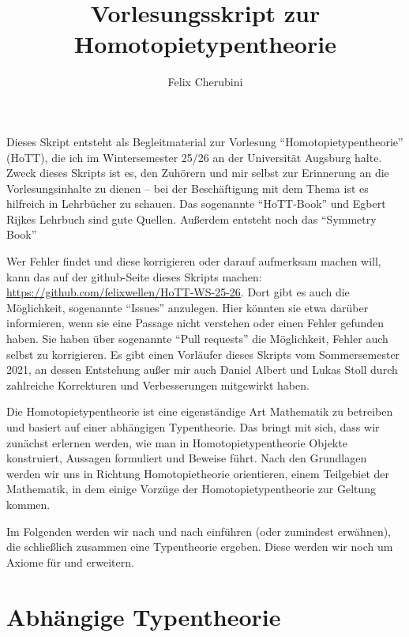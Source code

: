 \documentclass{../util/hott}
\title{Vorlesungsskript zur Homotopietypentheorie}
\author{Felix Cherubini}
\begin{document}
\maketitle

\tableofcontents
 \pagebreak
Dieses Skript entsteht als Begleitmaterial zur Vorlesung ``Homotopietypentheorie'' (HoTT), die ich im Wintersemester 25/26 an der Universität Augsburg halte.
Zweck dieses Skripts ist es, den Zuhörern und mir selbst zur Erinnerung an die Vorlesungsinhalte zu dienen --
bei der Beschäftigung mit dem Thema ist es hilfreich in Lehrbücher zu schauen.
Das sogenannte ``HoTT-Book''\cite{hott} und Egbert Rijkes Lehrbuch \cite{rijke} sind gute Quellen.
Außerdem entsteht noch das ``Symmetry Book'' \cite{Sym}

Wer Fehler findet und diese korrigieren oder darauf aufmerksam machen will, kann das auf der github-Seite dieses Skripts machen:
\href{https://github.com/felixwellen/HoTT-WS-25-26}{https://github.com/felixwellen/HoTT-WS-25-26}.
Dort gibt es auch die Möglichkeit, sogenannte ``Issues'' anzulegen.
Hier könnten sie etwa darüber informieren, wenn sie eine Passage nicht verstehen oder einen Fehler gefunden haben.
Sie haben über sogenannte ``Pull requests'' die Möglichkeit, Fehler auch selbst zu korrigieren.
Es gibt einen Vorläufer dieses Skripts vom Sommersemester 2021, an dessen Entstehung außer mir auch Daniel Albert und Lukas Stoll durch zahlreiche Korrekturen und Verbesserungen mitgewirkt haben.


Die Homotopietypentheorie ist eine eigenständige Art Mathematik zu betreiben und basiert auf einer abhängigen Typentheorie.
Das bringt mit sich, dass wir zunächst erlernen werden, wie man in Homotopietypentheorie Objekte konstruiert, Aussagen formuliert und Beweise führt.
Nach den Grundlagen werden wir uns in Richtung Homotopietheorie orientieren, einem Teilgebiet der Mathematik, in dem einige Vorzüge der Ho\-mo\-to\-pie\-ty\-pen\-theo\-rie zur Geltung kommen.

Im Folgenden werden wir nach und nach  einführen (oder zumindest erwähnen), die schließlich zusammen eine Typentheorie ergeben.
Diese werden wir noch um Axiome für  und  erweitern.

\section{Abhängige Typentheorie}


\printindex

\printbibliography
\end{document}
